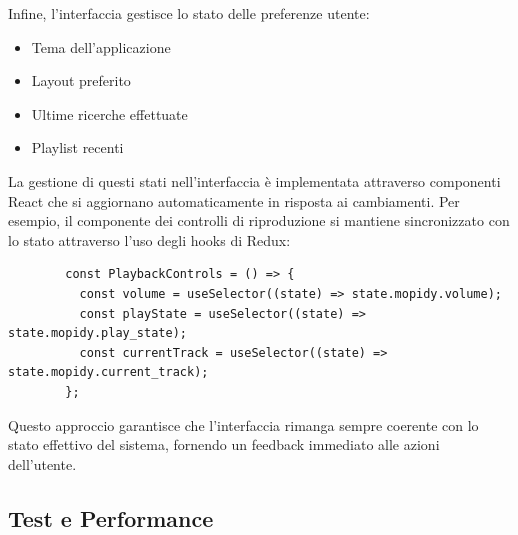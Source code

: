 Infine, l'interfaccia gestisce lo stato delle preferenze utente:

\begin{itemize}
    \item Tema dell'applicazione
    \item Layout preferito
    \item Ultime ricerche effettuate
    \item Playlist recenti
\end{itemize}

La gestione di questi stati nell'interfaccia è implementata attraverso componenti React che si aggiornano automaticamente in risposta ai cambiamenti. Per esempio, il componente dei controlli di riproduzione si mantiene sincronizzato con lo stato attraverso l'uso degli hooks di Redux:

\begin{table}[h]
    \begin{minipage}{\textwidth}
      \begin{verbatim}
        const PlaybackControls = () => {
          const volume = useSelector((state) => state.mopidy.volume);
          const playState = useSelector((state) => state.mopidy.play_state);
          const currentTrack = useSelector((state) => state.mopidy.current_track);
        };
      \end{verbatim}
    \end{minipage}
    \caption{}
    \label{tab:playbackcontrols}
  \end{table}

Questo approccio garantisce che l'interfaccia rimanga sempre coerente con lo stato effettivo del sistema, fornendo un feedback immediato alle azioni dell'utente.

\newpage
\subsection{Test e Performance}
\noindent


